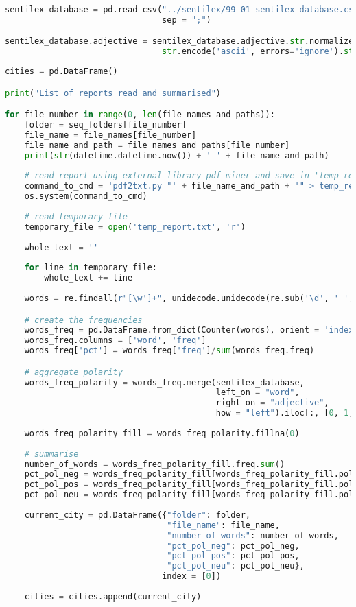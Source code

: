 \begin{lstlisting}[language=Python]
sentilex_database = pd.read_csv("../sentilex/99_01_sentilex_database.csv",
                                sep = ";")

sentilex_database.adjective = sentilex_database.adjective.str.normalize('NFKD').\
                                str.encode('ascii', errors='ignore').str.decode('utf-8')
\end{lstlisting}

\begin{lstlisting}[language=Python]
cities = pd.DataFrame()

print("List of reports read and summarised")

for file_number in range(0, len(file_names_and_paths)):
    folder = seq_folders[file_number]
    file_name = file_names[file_number]
    file_name_and_path = file_names_and_paths[file_number]
    print(str(datetime.datetime.now()) + ' ' + file_name_and_path)
    
    # read report using external library pdf miner and save in 'temp_report.txt'
    command_to_cmd = 'pdf2txt.py "' + file_name_and_path + '" > temp_report.txt'
    os.system(command_to_cmd)
    
    # read temporary file
    temporary_file = open('temp_report.txt', 'r')
    
    whole_text = ''
    
    for line in temporary_file:
        whole_text += line
    
    words = re.findall(r"[\w']+", unidecode.unidecode(re.sub('\d', ' ', whole_text).lower()))

    # create the frequencies
    words_freq = pd.DataFrame.from_dict(Counter(words), orient = 'index').reset_index()
    words_freq.columns = ['word', 'freq']
    words_freq['pct'] = words_freq['freq']/sum(words_freq.freq)

    # aggregate polarity
    words_freq_polarity = words_freq.merge(sentilex_database,
                                           left_on = "word",
                                           right_on = "adjective",
                                           how = "left").iloc[:, [0, 1, 2, 4]]
    
    words_freq_polarity_fill = words_freq_polarity.fillna(0)
    
    # summarise
    number_of_words = words_freq_polarity_fill.freq.sum()
    pct_pol_neg = words_freq_polarity_fill[words_freq_polarity_fill.polarity == -1].pct.sum()
    pct_pol_pos = words_freq_polarity_fill[words_freq_polarity_fill.polarity == 1].pct.sum()
    pct_pol_neu = words_freq_polarity_fill[words_freq_polarity_fill.polarity == 0].pct.sum()
    
    current_city = pd.DataFrame({"folder": folder,
                                 "file_name": file_name,
                                 "number_of_words": number_of_words,
                                 "pct_pol_neg": pct_pol_neg,
                                 "pct_pol_pos": pct_pol_pos,
                                 "pct_pol_neu": pct_pol_neu},
                                index = [0])
    
    cities = cities.append(current_city)
\end{lstlisting}


